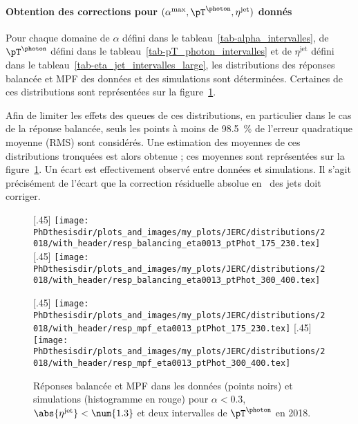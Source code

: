 \paragraph{Obtention des corrections pour $(\alpha^\text{max}, \pT^{\photon}, \eta^\text{jet})$ donnés}
Pour chaque domaine
de $\alpha$ défini dans le tableau~\ref{tab-alpha_intervalles},
de $\pT^{\photon}$ défini dans le tableau~\ref{tab-pT_photon_intervalles} et
de $\eta^\text{jet}$ défini dans le tableau~\ref{tab-eta_jet_intervalles_large},
les distributions des réponses balancée et MPF des données et des simulations sont déterminées.
Certaines de ces distributions sont représentées sur la figure~\ref{fig-distribs_Gjets_18_resp_bal_and_mpf}.
\par Afin de limiter les effets des queues de ces distributions, en particulier dans le cas de la réponse balancée, seuls les points à moins de \SI{98.5}{\%} de l'erreur quadratique moyenne (RMS) sont considérés.
Une estimation des moyennes de ces distributions tronquées est alors obtenue ; ces moyennes sont représentées sur la figure~\ref{fig-distribs_Gjets_18_resp_bal_and_mpf}.
Un écart est effectivement observé entre données et simulations.
Il s'agit précisément de l'écart que la correction résiduelle absolue en \pT\ des jets doit corriger.
\begin{figure}[h]
\centering
\subcaptionbox{Réponse balancée pour $\pT^{\photon}\in[175, 230[$ \SI{}{\GeV}.\label{subfig-distrib_Gjets_18_resp_balancing_eta0013_ptPhot_175_230}}[.45\textwidth]
{\texttt{[image: \\PhDthesisdir/plots\_and\_images/my\_plots/JERC/distributions/2018/with\_header/resp\_balancing\_eta0013\_ptPhot\_175\_230.tex]}}
\hfill
\subcaptionbox{Réponse balancée pour $\pT^{\photon}\in[300, 400[$ \SI{}{\GeV}.\label{subfig-distrib_Gjets_18_resp_balancing_eta0013_ptPhot_300_400}}[.45\textwidth]
{\texttt{[image: \\PhDthesisdir/plots\_and\_images/my\_plots/JERC/distributions/2018/with\_header/resp\_balancing\_eta0013\_ptPhot\_300\_400.tex]}}

\vspace{.5\baselineskip}

\subcaptionbox{Réponse MPF pour $\pT^{\photon}\in[175, 230[$ \SI{}{\GeV}.\label{subfig-distrib_Gjets_18_resp_mpf_eta0013_ptPhot_175_230}}[.45\textwidth]
{\texttt{[image: \\PhDthesisdir/plots\_and\_images/my\_plots/JERC/distributions/2018/with\_header/resp\_mpf\_eta0013\_ptPhot\_175\_230.tex]}}
\hfill
\subcaptionbox{Réponse MPF pour $\pT^{\photon}\in[300, 400[$ \SI{}{\GeV}.\label{subfig-distrib_Gjets_18_resp_mpf_eta0013_ptPhot_300_400}}[.45\textwidth]
{\texttt{[image: \\PhDthesisdir/plots\_and\_images/my\_plots/JERC/distributions/2018/with\_header/resp\_mpf\_eta0013\_ptPhot\_300\_400.tex]}}

\caption[Réponses balancée et MPF en 2018.]{Réponses balancée et MPF dans les données (points noirs) et simulations (histogramme en rouge) pour $\alpha<\num{0.3}$, $\abs{\eta^\text{jet}}<\num{1.3}$ et deux intervalles de $\pT^{\photon}$ en 2018.}
\label{fig-distribs_Gjets_18_resp_bal_and_mpf}
\end{figure}
